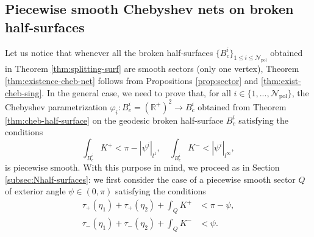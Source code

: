 \documentclass{article}
\newcommand{\argmax}{\operatornamewithlimits{argmax}}
\newcommand{\R}{\mathbb{R}}
\newcommand{\sect}{Q}
\newcommand{\halfP}{B}
\newcommand{\Npiece}{\mathcal{N}_{\mathrm{piece}}}
\newcommand{\Npol}{\mathcal{N}_{\mathrm{pol}}}
\theoremstyle{remark}
\newtheorem{remarkE}[theorem]{Remark}
\theoremstyle{prpart}
\begin{document}
\subsection{Piecewise smooth Chebyshev nets on broken half-surfaces}\label{subsubsec:half-surfaces-smooth-cheb}
Let us notice that whenever all the broken half-surfaces $\{\halfP^i_c\}_{1\leq i\leq\Npol}$ obtained in Theorem \ref{thm:splitting-surf} are smooth sectors (only one vertex), Theorem \ref{thm:existence-cheb-net} follows from Propositions \ref{prop:sector} and \ref{thm:exist-cheb-sing}. In the general case, we need to prove that, for all $i\in\{1,...,\Npol\}$, the Chebyshev parametrization $\varphi_i:\halfP_e^i=(\R^+)^2\to \halfP_c^i$ obtained from Theorem \ref{thm:cheb-half-surface} on the geodesic broken half-surface $\halfP^i_c$ satisfying the conditions
\begin{equation} \label{eq:cond-geod-half-surf}
  \int_{\halfP^i_c} K^+ < \pi-|\psi^i|_{l^1}, \quad\int_{\halfP^i_c} K^- < |\psi^i|_{l^\infty},
\end{equation} 
is piecewise smooth. With this purpose in mind, we proceed as in Section \ref{subsec:Nhalf-surfaces}: we first consider the case of a piecewise smooth sector $\sect$ of exterior angle $\psi\in(0,\pi)$ satisfying the conditions
\begin{subequations}\label{eq:cond-sectorb}
    \begin{alignat}{2}  \label{eq:cond-sectorb1}
     \tau_+(\eta_1) + \tau_+(\eta_2) + \int_\sect K^+ &< \pi-\psi,  \\
     \tau_-(\eta_1) + \tau_-(\eta_2) + \int_\sect K^- &< \psi. \label{eq:cond-sectorb2}
  \end{alignat}
\end{subequations}


\end{document}
